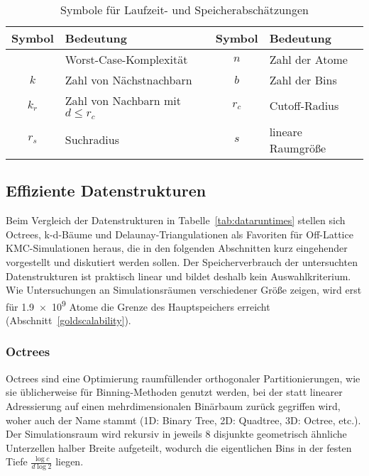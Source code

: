 \begin{table}[!ht]
  \vspace{1em}

  \oddrowcolors
  \caption{Symbole für Laufzeit- und Speicherabschätzungen}
  \label{tab:datasymbols}
  \begin{tabularx}{\textwidth}{|cX|cX|}
    \hline
    \textbf{Symbol} & \textbf{Bedeutung}                 & \textbf{Symbol} & \textbf{Bedeutung} \\
    \hline
    \BigO{}         & Worst-Case-Komplexität             & $n$             & Zahl der Atome     \\
    $k$             & Zahl von Nächstnachbarn            & $b$             & Zahl der Bins      \\
    $k_r$           & Zahl von Nachbarn mit $d \leq r_c$ & $r_c$           & Cutoff-Radius      \\
    $r_s$           & Suchradius                         & $s$             & lineare Raumgröße  \\
    \hline
  \end{tabularx}

\end{table}

\subsection{Effiziente Datenstrukturen}

Beim Vergleich der Datenstrukturen in Tabelle~\ref{tab:dataruntimes} stellen sich Octrees, k-d-Bäume und Delaunay-Triangulationen als Favoriten für Off-Lattice KMC-Simulationen heraus, die in den folgenden Abschnitten kurz eingehender vorgestellt und diskutiert werden sollen.
Der Speicherverbrauch der untersuchten Datenstrukturen ist praktisch linear und bildet deshalb kein Auswahlkriterium.
Wie Untersuchungen an Simulationsräumen verschiedener Größe zeigen, wird erst für \num{1.9e9} Atome die Grenze des Hauptspeichers erreicht (Abschnitt~\ref{goldscalability}).

\subsubsection{Octrees}
\label{dataoctree}

Octrees sind eine Optimierung raumfüllender orthogonaler Partitionierungen, wie sie üblicherweise für Binning-Methoden genutzt werden, bei der statt linearer Adressierung auf einen mehrdimensionalen Binärbaum zurück gegriffen wird, woher auch der Name stammt (1D: Binary Tree, 2D: Quadtree, 3D: Octree, etc.).
Der Simulationsraum wird rekursiv in jeweils 8 disjunkte geometrisch ähnliche Unterzellen halber Breite aufgeteilt, wodurch die eigentlichen Bins in der festen Tiefe $\frac{\log{c}}{d\log{2}}$ liegen.


